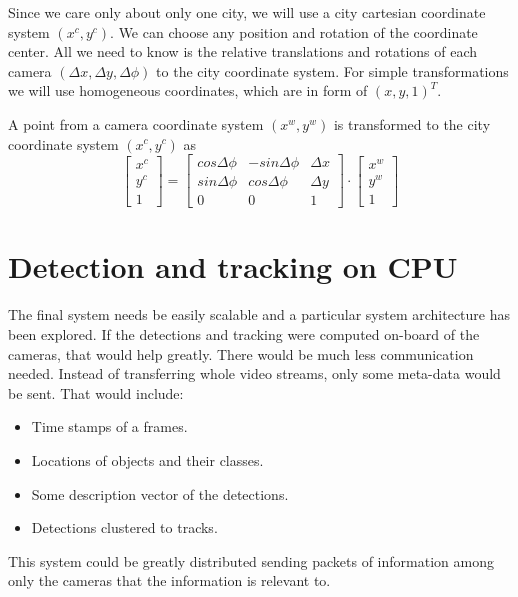 \documentclass[a4paper,12pt,titlepage]{article}
\numberwithin{figure}{section}
\begin{document}
Since we care only about only one city, we will use a city cartesian coordinate system $(x^c, y^c)$. We can choose any position and rotation of the coordinate center. All we need to know is the relative translations and rotations of each camera $(\Delta x, \Delta y, \Delta\phi)$ to the city coordinate system. For simple transformations we will use homogeneous coordinates, which are in form of $(x, y, 1)^T$. 


A point from a camera coordinate system $(x^w, y^w)$ is transformed to the city coordinate system $(x^c, y^c)$ as
\[
  \begin{bmatrix}
    x^c \\
    y^c \\
    1
  \end{bmatrix}
   = 
  \begin{bmatrix}
    cos\Delta\phi & -sin\Delta\phi & \Delta x\\
    sin\Delta\phi & cos\Delta\phi & \Delta y\\
    0 & 0 & 1
  \end{bmatrix}   
  \cdot 
  \begin{bmatrix}
    x^w \\
    y^w \\
    1
  \end{bmatrix}
\]








\section{Detection and tracking on CPU}
\label{sec:classical}
The final system needs be easily scalable and a particular system architecture has been explored. If the detections and tracking were computed on-board of the cameras, that would help greatly. There would be much less communication needed. Instead of transferring whole video streams, only some meta-data would be sent. That would include: 

\begin{itemize}
\item Time stamps of a frames.
\item Locations of objects and their classes.
\item Some description vector of the detections.
\item Detections clustered to tracks.
\end{itemize}

This system could be greatly distributed sending packets of information among only the cameras that the information is relevant to.
\end{document}
